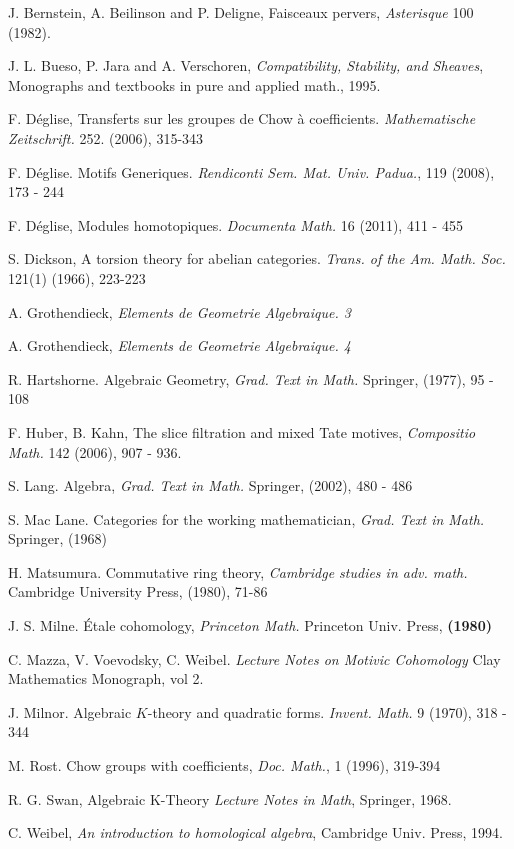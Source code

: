 \newpage

\begin{thebibliography}{10}

J. Bernstein, A. Beilinson and P. Deligne,
Faisceaux pervers, {\em Asterisque} 100 (1982).

J. L. Bueso, P. Jara and A. Verschoren,
{\em Compatibility, Stability, and Sheaves}, 
Monographs and textbooks in pure and applied math.,
1995.

F. D\'eglise,
Transferts sur les groupes de Chow \`a coefficients.
{\em Mathematische Zeitschrift.} 252. (2006), 315-343

F. D\'eglise.
Motifs Generiques.
\emph{Rendiconti Sem. Mat. Univ. Padua.}, 119 (2008), 173 - 244

F. D\'eglise, 
Modules homotopiques.
{\em Documenta Math.}
16 (2011), 411 - 455

S. Dickson,
A torsion theory for abelian categories.
{\em Trans. of the Am. Math. Soc.} 121(1) (1966), 223-223

A. Grothendieck,
{\em Elements de Geometrie Algebraique. 3}

A. Grothendieck,
{\em Elements de Geometrie Algebraique. 4}

R. Hartshorne.
Algebraic Geometry, {\em Grad. Text in Math.}
Springer, (1977), 95 - 108

F. Huber, B. Kahn, The slice filtration and mixed Tate motives,
{\em Compositio Math.} 142 (2006), 907 - 936.

S. Lang.
Algebra, {\em Grad. Text in Math.}
Springer, (2002), 480 - 486

S. Mac Lane.
Categories for the working mathematician, {\em Grad. Text in Math.}
Springer, (1968)

H. Matsumura.
Commutative ring theory, {\em Cambridge studies in adv. math.}
Cambridge University Press, (1980), 71-86

J. S. Milne.
\'Etale cohomology, {\em Princeton Math.}
Princeton Univ. Press, \textbf{(1980)}

C. Mazza, V. Voevodsky, C. Weibel.
{\em Lecture Notes on Motivic Cohomology}
Clay Mathematics Monograph, vol 2.

J. Milnor.
Algebraic $K$-theory and quadratic forms.
{\em Invent. Math.} 9 (1970), 318 - 344

M. Rost.
Chow groups with coefficients,
{\em Doc. Math.}, 1 (1996), 319-394

R. G. Swan,
Algebraic K-Theory
{\em Lecture Notes in Math},
Springer, 1968.

C. Weibel,
{\em An introduction to homological algebra},
Cambridge Univ. Press, 1994.
\end{thebibliography}
